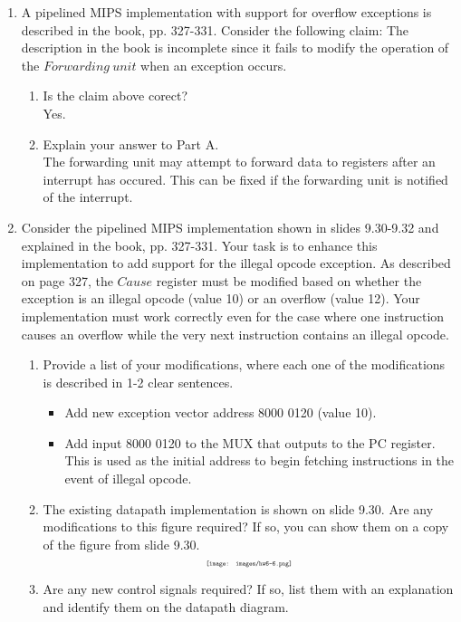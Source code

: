 \documentclass[10pt,letterpaper]{article}
\begin{document}
\begin{enumerate}[label=\textbf{Problem \arabic*.}]
\begin{enumerate}[label=\Alph*)]
	\end{enumerate}
\item A pipelined MIPS implementation with support for overflow exceptions is described in the book, pp. 327-331. Consider the following claim: The description in the book is incomplete since it fails to modify the operation of the $Forwarding \ unit$ when an exception occurs.
	\begin{enumerate}[label=\Alph*)]
	\item Is the claim above corect?\\
	Yes.
	\item Explain your answer to Part A.\\
	The forwarding unit may attempt to forward data to registers after an interrupt has occured. This can be fixed if the forwarding unit is notified of the interrupt.
	\end{enumerate}
\item Consider the pipelined MIPS implementation shown in slides 9.30-9.32 and explained in the book, pp. 327-331. Your task is to enhance this implementation to add support for the illegal opcode exception. As described on page 327, the $Cause$ register must be modified based on whether the exception is an illegal opcode (value 10) or an overflow (value 12). Your implementation must work correctly even for the case where one instruction causes an overflow while the very next instruction contains an illegal opcode.
	\begin{enumerate}[label=\Alph*)]
	\item Provide a list of your modifications, where each one of the modifications is described in 1-2 clear sentences.
		\begin{itemize}
		\item Add new exception vector address 8000 0120 (value 10). 
		\item Add input 8000 0120 to the MUX that outputs to the PC register. This is used as the initial address to begin fetching instructions in the event of illegal opcode.
		\end{itemize}
	\item The existing datapath implementation is shown on slide 9.30. Are any modifications to this figure required? If so, you can show them on a copy of the figure from slide 9.30. 
	\[\scalebox{0.5}{\texttt{[image: images/hw6-6.png]}}\]
	\item Are any new control signals required? If so, list them with an explanation and identify them on the datapath diagram.\\

\end{enumerate}
\end{enumerate}
\end{document}
